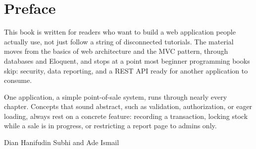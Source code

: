 
\chapter*{Preface}

\noindent
This book is written for readers who want to build a web application people
actually use, not just follow a string of disconnected tutorials. The material
moves from the basics of web architecture and the MVC pattern, through
databases and Eloquent, and stops at a point most beginner programming books
skip: security, data reporting, and a REST API ready for another application
to consume.

\vspace{1cm}

\noindent
One application, a simple point-of-sale system, runs through nearly every
chapter. Concepts that sound abstract, such as validation, authorization, or
eager loading, always rest on a concrete feature: recording a transaction,
locking stock while a sale is in progress, or restricting a report page to
admins only.

\vspace{1cm}

\noindent
Dian Hanifudin Subhi and Ade Ismail

\vspace{2cm}

\cleardoublepage
